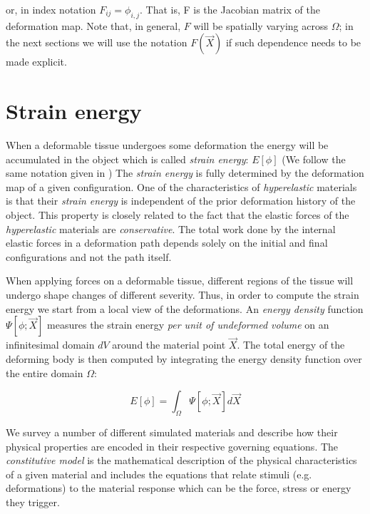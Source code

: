 or, in index notation $F_{ij} = \phi_{i,j}$. That is, F is the Jacobian matrix of the deformation map. Note that, in general, $F$ will be spatially varying 
across $\Omega$; in the next sections we will use the notation $F(\vec{X})$ if such dependence needs to be made explicit.

\section{Strain energy}
When a deformable tissue undergoes some deformation the energy will be accumulated in the object which is called \textit{strain energy}: $E[\phi]$ (We 
follow the same notation given in \cite{Sifakis2012}) The \textit{strain energy} is fully determined by the deformation map of a given configuration.
One of the characteristics of \textit{hyperelastic} materials is that their \textit{strain energy} is independent of the prior deformation history 
of the object. This property is closely related to the fact that the elastic forces of the \textit{hyperelastic} materials are \textit{conservative}.
The total work done by the internal elastic forces in a deformation path depends solely on the initial and final configurations and not the path itself.

When applying forces on a deformable tissue, different regions of the tissue will undergo shape changes of different severity. Thus, in order to compute the 
strain energy we start from a local view of the deformations. An \textit{energy density} function $\Psi[\phi; \vec{X}]$ measures the strain energy 
\textit{per unit of undeformed volume} on an infinitesimal domain $dV$ around the material point $\vec{X}$. The total energy of the deforming body is then 
computed by integrating the energy density function over the entire domain $\Omega$:

\begin{equation}
  E[\phi]=\int_\Omega\Psi[\phi;\vec{X}]d\vec{X}
\end{equation}


We survey a number of different simulated materials and describe how their physical properties are encoded in their respective governing equations. The 
\textit{constitutive model} is the mathematical description of the physical characteristics of a given material and includes the equations that relate
stimuli (e.g. deformations) to the material response which can be the force, stress or energy they trigger. 

